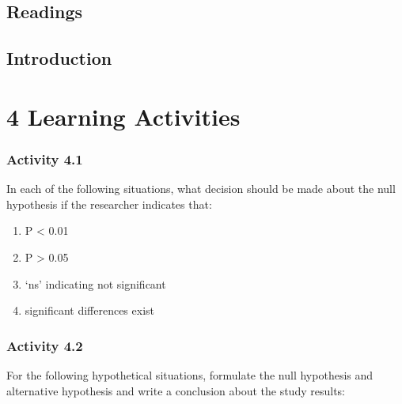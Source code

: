 \documentclass[
]{memoir}
\providecommand{\tightlist}{%
  \setlength{\itemsep}{0pt}\setlength{\parskip}{0pt}}
\begin{document}
\hypertarget{readings-3}{%
\section*{Readings}\label{readings-3}}

\citep{kirkwood_sterne01}

\citep{bland15}

\hypertarget{introduction-1}{%
\section{Introduction}\label{introduction-1}}

\hypertarget{learning-activities-3}{%
\chapter*{\texorpdfstring{\textbf{4} Learning Activities}{4 Learning Activities}}\label{learning-activities-3}}

\hypertarget{activity-4.1}{%
\subsection{Activity 4.1}\label{activity-4.1}}

In each of the following situations, what decision should be made about the null hypothesis if the researcher indicates that:

\begin{enumerate}
\def\labelenumi{\alph{enumi})}
\tightlist
\item
  P \textless{} 0.01
\item
  P \textgreater{} 0.05
\item
  `ns' indicating not significant
\item
  significant differences exist
\end{enumerate}

\hypertarget{activity-4.2}{%
\subsection{Activity 4.2}\label{activity-4.2}}

For the following hypothetical situations, formulate the null hypothesis and alternative hypothesis and write a conclusion about the study results:
\end{document}
